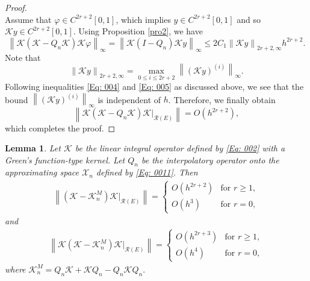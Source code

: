 \documentclass[pdflatex, sn-mathphys-num]{sn-jnl}%
\newcommand{\norm}[1]{\left\lVert #1\right\rVert}
\theoremstyle{thmstyleone}%
\newtheorem{lemma}[theorem]{Lemma}
\theoremstyle{thmstyletwo}%
\theoremstyle{thmstylethree}%
\begin{document}
\begin{proof}
\begin{equation*}
	\end{equation*}
	Assume that \(\varphi \in C^{2r+2}[0,1]\), which implies \(y \in C^{2r+2}[0,1]\) and so \(\mathcal{K}y \in C^{2r+2}[0,1]\). Using Proposition \ref{pro2}, we have
	\begin{equation*}
		\norm{\mathcal{K}(\mathcal{K} - Q_n \mathcal{K}) \mathcal{K} \varphi }_\infty = \norm{\mathcal{K}(I - Q_n ) \mathcal{K} y }_\infty \leq2C_1 \norm{\mathcal{K}y}_{2r+2, \infty} h^{2r+2}.
	\end{equation*}
	Note that 
	\begin{equation*}
		\norm{\mathcal{K}y}_{2r+2, \infty} = \max_{0 \leq i \leq2r +2} \norm{ \left(\mathcal{K}y\right)^{(i)}}_\infty.
	\end{equation*}
	Following inequalities \eqref{Eq: 004} and \eqref{Eq: 005} as discussed above,  we see that the bound \(\norm{ \left(\mathcal{K}y\right)^{(i)}}_\infty \) is independent of \(h\). Therefore, we finally obtain
	\begin{equation*}
		\norm{ \mathcal{K} (\mathcal{K} - Q_n \mathcal{K}) \mathcal{K} |_{\mathcal{R}(E)} } = O\left(h^{2r +2}\right),
	\end{equation*}
	which completes the proof.
\end{proof}
\begin{lemma} \label{lem4}
	Let $ \mathcal{K}$ be the linear integral operator defined by \eqref{Eq: 002} with a Green's function-type kernel. Let $Q_n$ be the interpolatory operator onto the approximating space $\mathcal{X}_n$ defined by \eqref{Eq: 0011}. Then
	\begin{eqnarray*}
		\norm{(\mathcal{K} - \mathcal{K}_n^M) \mathcal{K} |_{\mathcal{R}(E)}} = 
		\begin{cases}
			O\left(h^{2r+2}\right) & \text{for } r \geq 1, \\
			O\left(h^{3}\right) & \text{for } r = 0,
		\end{cases}
	\end{eqnarray*}
	and
	\begin{eqnarray*}
		\norm{\mathcal{K} (\mathcal{K} - \mathcal{K}_n^M) \mathcal{K} |_{\mathcal{R}(E)}} =
		\begin{cases}
			O\left(h^{2r+3}\right) & \text{for } r \geq 1, \\
			O\left(h^{4} \right) & \text{for } r = 0,
		\end{cases}
	\end{eqnarray*}
	where $\mathcal{K}_n^M= Q_n \mathcal{K} + \mathcal{K} Q_n - Q_n \mathcal{K} Q_n.$
\end{lemma}
\end{document}

